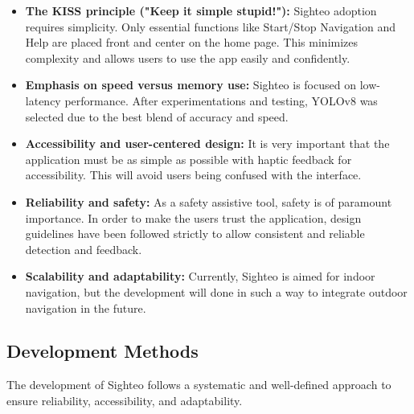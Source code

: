 \documentclass{FastFyp}
\begin{document}
\begin{itemize}
    \item \textbf{The KISS principle ("Keep it simple stupid!"):} Sighteo adoption requires simplicity. Only essential functions like Start/Stop Navigation and Help are placed front and center on the home page. This minimizes complexity and allows users to use the app easily and confidently.  

    \item \textbf{Emphasis on speed versus memory use:} Sighteo is focused on low-latency performance. After experimentations and testing, YOLOv8 was selected due to the best blend of accuracy and speed.

    \item \textbf{Accessibility and user-centered design:} It is very important that the application must be as simple as possible with haptic feedback for accessibility. This will avoid users being confused with the interface.

    \item \textbf{Reliability and safety:} As a safety assistive tool, safety is of paramount importance. In order to make the users trust the application, design guidelines have been followed strictly to allow consistent and reliable detection and feedback.

    \item \textbf{Scalability and adaptability:} Currently, Sighteo is aimed for indoor navigation, but the development will done in such a way to integrate outdoor navigation in the future.
\end{itemize}

 
\subsection{ Development Methods}
The development of Sighteo follows a systematic and well-defined approach to ensure reliability, accessibility, and adaptability.  
\end{document}
